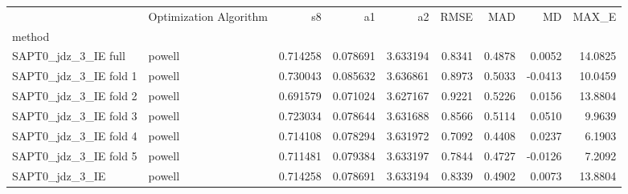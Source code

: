\begin{tabular}{llrrrrrrr}
 & Optimization Algorithm & s8 & a1 & a2 & RMSE & MAD & MD & MAX_E \\
method &  &  &  &  &  &  &  &  \\
SAPT0_jdz_3_IE full & powell & 0.714258 & 0.078691 & 3.633194 & 0.8341 & 0.4878 & 0.0052 & 14.0825 \\
SAPT0_jdz_3_IE fold 1 & powell & 0.730043 & 0.085632 & 3.636861 & 0.8973 & 0.5033 & -0.0413 & 10.0459 \\
SAPT0_jdz_3_IE fold 2 & powell & 0.691579 & 0.071024 & 3.627167 & 0.9221 & 0.5226 & 0.0156 & 13.8804 \\
SAPT0_jdz_3_IE fold 3 & powell & 0.723034 & 0.078644 & 3.631688 & 0.8566 & 0.5114 & 0.0510 & 9.9639 \\
SAPT0_jdz_3_IE fold 4 & powell & 0.714108 & 0.078294 & 3.631972 & 0.7092 & 0.4408 & 0.0237 & 6.1903 \\
SAPT0_jdz_3_IE fold 5 & powell & 0.711481 & 0.079384 & 3.633197 & 0.7844 & 0.4727 & -0.0126 & 7.2092 \\
SAPT0_jdz_3_IE & powell & 0.714258 & 0.078691 & 3.633194 & 0.8339 & 0.4902 & 0.0073 & 13.8804 \\
\end{tabular}

